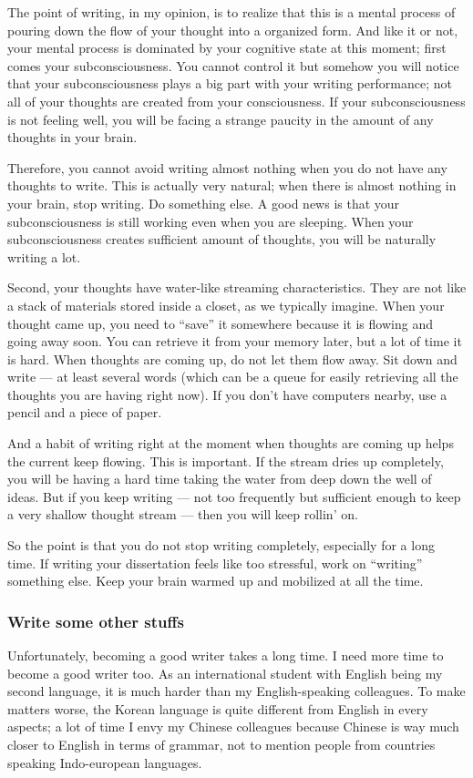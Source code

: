 \documentclass[11pt]{article}
\begin{document}
The point of writing, in my opinion, is to realize that this is a mental process
of pouring down the flow of your thought into a organized form.
And like it or not, your mental process is dominated by your cognitive
state at this moment; first comes your subconsciousness. You cannot control it but
somehow you will notice that your subconsciousness plays a big part with
your writing performance; not all of your thoughts are created from your
consciousness. If your subconsciousness is not feeling well, you will
be facing a strange paucity in the amount of any thoughts in your brain.

Therefore, you cannot avoid writing almost nothing when you do not have any
thoughts to write. This is actually very natural; when there is almost nothing
in your brain, stop writing. Do something else. A good news is that your
subconsciousness is still working even when you are sleeping.  When your
subconsciousness creates sufficient amount of thoughts, you will be naturally
writing a lot. 

Second, your thoughts have water-like streaming characteristics. They are not
like a stack of materials stored inside a closet, as we typically imagine.
When your thought came up, you need to ``save'' it somewhere because it is
flowing and going away soon. You can retrieve it from your memory later, but a
lot of time it is hard. When thoughts are coming up, do not let them flow
away.  Sit down and write --- at least several words (which can be a queue for
easily retrieving all the thoughts you are having right now). If you don't
have computers nearby, use a pencil and a piece of paper. 

And a habit of writing right at the moment when thoughts are coming up helps the
current keep flowing. This is important. If the stream dries up completely, you
will be having a hard time taking the water from deep down the well of ideas.
But if you keep writing --- not too frequently but sufficient enough to keep a
very shallow thought stream --- then you will keep rollin' on.

So the point is that you do not stop writing completely, especially for
a long time. If writing your dissertation feels like too stressful, work
on ``writing'' something else. Keep your brain warmed up and mobilized 
at all the time.



\subsubsection{Write some other stuffs}
Unfortunately, becoming a good writer takes a long time. I need more time to
become a good writer too. As an international student with English being my
second language, it is much harder than my English-speaking colleagues. To make
matters worse, the Korean language is quite different from English in every
aspects; a lot of time I envy my Chinese colleagues because Chinese is way much
closer to English in terms of grammar, not to mention people from countries
speaking Indo-european languages.
\end{document}
